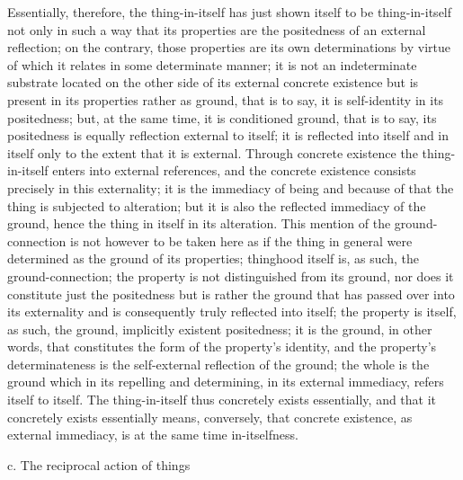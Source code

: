 Essentially, therefore, the thing-in-itself has just shown itself
to be thing-in-itself not only in such a way that its properties are
the positedness of an external reflection;
on the contrary, those properties are its own determinations
by virtue of which it relates in some determinate manner;
it is not an indeterminate substrate located on the other side of its external
concrete existence
 but is present in its properties rather as ground, that
is to say, it is self-identity in its positedness; but, at the same time, it
is conditioned ground, that is to say, its positedness is equally reflection
external to itself; it is reflected into itself and in itself only to the extent
that it is external.
Through concrete existence the thing-in-itself enters
into external references, and the concrete existence consists precisely in this
externality; it is the immediacy of being and because of that the thing is
subjected to alteration; but it is also the reflected immediacy of the ground,
hence the thing in itself in its alteration.
This mention of the ground-connection is not however to be taken here
as if the thing in general were determined as the ground of its properties;
thinghood itself is, as such, the ground-connection;
the property is not distinguished from its ground,
nor does it constitute just the positedness
but is rather the ground that has
passed over into its externality
and is consequently truly reflected into itself;
the property is itself, as such, the ground, implicitly existent positedness;
it is the ground, in other words, that constitutes the form of the property's
identity, and the property's determinateness is the self-external reflection of
the ground; the whole is the ground which in its repelling and determining,
in its external immediacy, refers itself to itself.
The thing-in-itself thus
concretely exists essentially, and that it concretely exists essentially means,
conversely, that concrete existence, as external immediacy, is at the same
time in-itselfness.

c. The reciprocal action of things

